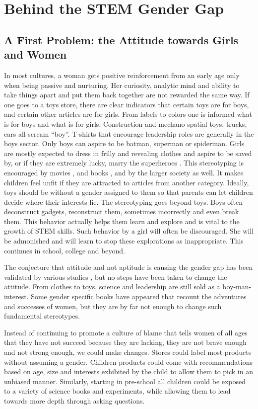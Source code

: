 \documentclass[utf8]{frontiersSCNS} %
\begin{document}
\section{Behind the STEM Gender Gap}
\label{causes}
\subsection{A First Problem: the Attitude towards Girls and Women}
\label{Sec2}
 In most cultures, a woman gets positive reinforcement from an early age only when being passive and nurturing. Her curiosity, analytic mind and ability to take things apart and put them back together are not rewarded the same way. If one goes to a toys store, there are clear indicators that certain toys are for boys, and certain other articles are for girls. From labels to colors one is informed what is for boys and what is for girls. Construction and mechano-spatial toys, trucks, cars all scream “boy”. T-shirts that encourage leadership roles are generally in the boys sector. Only boys can aspire to be batman, superman or spiderman. Girls are mostly expected to dress in frilly and revealing clothes and aspire to be saved by, or if they are extremely lucky, marry the superheroes \citep{graff2012too}. This stereotyping is encouraged by movies \citep{bleakley2012trends}, and books \citep{hamilton2006gender}, and by the larger society as well. It makes children feel unfit if they are attracted to articles from another category. Ideally, toys should be without a gender assigned to them so that parents can let children decide where their interests lie. The stereotyping goes beyond toys. Boys often deconstruct gadgets, reconstruct them, sometimes incorrectly and even break them. This behavior actually helps them learn and explore and is vital to the growth of STEM skills. Such behavior by a girl will often be discouraged. She will be admonished and will learn to stop these explorations as inappropriate. This continues in school, college and beyond.
 
The conjecture that attitude and not aptitude is causing the gender gap has been validated by various studies  \citep{penner2015gender, leslie2015expectations}, but no steps have been taken to change the attitude.  From clothes to toys, science and leadership are still sold as a boy-man-interest. Some gender specific books have appeared that recount the adventures and successes of women, but they are by far not enough to change such fundamental stereotypes. 

Instead of continuing to promote a culture of blame that tells women of all ages that they have not succeed because they are lacking, they are not brave enough and not strong enough, we could make changes.  Stores could label most products without assuming a gender. Children products could come with recommendations based on age, size and interests exhibited by the child to allow them to pick in an unbiased manner. Similarly, starting in pre-school all children could be exposed to a variety of science books and experiments, while allowing them to lead towards more depth through asking questions.
\end{document}
